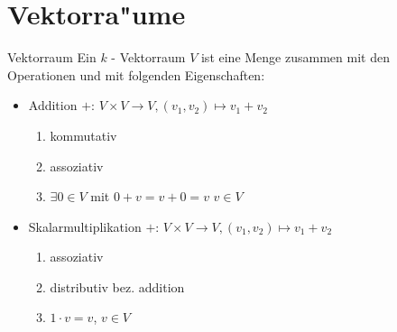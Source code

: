 \documentclass[11pt]{article}
\theoremstyle{remark}
\theoremstyle{definition}
\theoremstyle{remark}
\begin{document}
\section{Vektorra"ume}
\label{sec:org4906e00}
\begin{definition}{Vektorraum}{}
Ein \(k\) - Vektorraum \(V\) ist eine Menge zusammen mit den Operationen und mit
folgenden Eigenschaften:
\begin{itemize}
\item Addition \(+:\, V\times V \to V, (v_1,v_2)\mapsto v_1+v_2\)
\begin{enumerate}
\item kommutativ
\item assoziativ
\item \(\exists 0 \in V\) mit \(0+v=v+0=v\) \(v \in V\)
\end{enumerate}
\item Skalarmultiplikation \(+:\, V\times V \to V, (v_1,v_2)\mapsto v_1+v_2\)
\begin{enumerate}
\item assoziativ
\item distributiv bez. addition
\item \(1\cdot v = v\), \(v\in V\)
\end{enumerate}
\end{itemize}
\end{definition}
\end{document}
